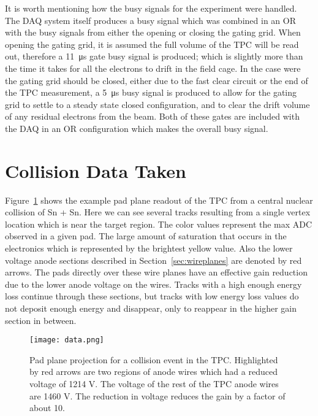  
 It is worth mentioning how the busy signals for the experiment were handled. The DAQ system itself produces a busy signal which was combined in an OR with the busy signals from either the opening or closing the gating grid. When opening the gating grid, it is assumed the full volume of the TPC will be read out, therefore  a \SI{11}{\micro\second} gate busy signal is produced; which is slightly more than the time it takes for all the electrons to drift in the field cage. In the case were the gating grid should be closed, either due to the fast clear circuit or the end of the TPC measurement, a \SI{5}{\micro\second} busy signal is produced to allow for the gating grid to settle to a steady state closed configuration, and to clear the drift volume of any residual electrons from the beam. Both of these gates are included with the DAQ in an OR configuration which makes the overall busy signal. 
 


\section{Collision Data Taken}

Figure~\ref{fig:data} shows the example pad plane readout of the TPC from a central nuclear collision of Sn + Sn. Here we can see several tracks resulting from a single vertex location which is near the target region. The color values represent the max ADC observed in a given pad. The large amount of saturation that occurs in the electronics which is represented by the brightest yellow value. Also the lower voltage anode sections described in Section~\ref{sec:wireplanes} are denoted by red arrows. The pads directly over these wire planes have an effective gain reduction due to the lower anode voltage on the wires. Tracks with a high enough energy loss continue through these sections, but tracks with low energy loss values do not deposit enough energy and disappear, only to reappear in the higher gain section in between. 

\begin{figure}[!htb]
\texttt{[image: data.png]}
\caption{Pad plane projection for a collision event in the TPC. Highlighted by red arrows are two regions of anode wires which had a reduced voltage of 1214 V. The voltage of the rest of the TPC anode wires are 1460 V. The reduction in voltage reduces the gain by a factor of about 10. }
\label{fig:data}
\end{figure}



